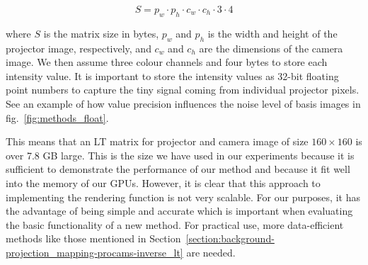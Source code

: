 \begin{equation}
    \label{eq:lt_matrix_size}
    S = p_w \cdot p_h \cdot c_w \cdot c_h \cdot 3 \cdot 4
\end{equation}

where \(S\) is the matrix size in bytes, \(p_w\) and \(p_h\) is the width and height of the projector image, respectively, and \(c_w\) and \(c_h\) are the dimensions of the camera image. We then assume three colour channels and four bytes to store each intensity value. It is important to store the intensity values as 32-bit floating point numbers to capture the tiny signal coming from individual projector pixels. See an example of how value precision influences the noise level of basis images in fig.~\ref{fig:methods_float}.

This means that an LT matrix for projector and camera image of size \(160 \times 160\) is over 7.8 GB large. This is the size we have used in our experiments because it is sufficient to demonstrate the performance of our method and because it fit well into the memory of our GPUs. However, it is clear that this approach to implementing the rendering function is not very scalable. For our purposes, it has the advantage of being simple and accurate which is important when evaluating the basic functionality of a new method. For practical use, more data-efficient methods like those mentioned in Section~\ref{section:background-projection_mapping-procams-inverse_lt} are needed.

